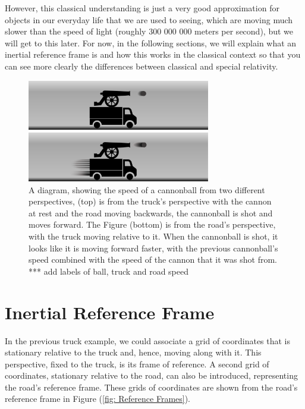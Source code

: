 However, this classical understanding is just a very good approximation for objects in our everyday life that we are used to seeing, which are moving much slower than the speed of light (roughly 300 000 000 meters per second), but we will get to this later.
For now, in the following sections, we will explain what an inertial reference frame is and how this works in the classical context so that you can see more clearly the differences between classical and special relativity.

\begin{figure}[H]
	\centering
	\includegraphics[width = 8cm]{images/pdf/lorry_cannonball.pdf}
	\caption{A diagram, showing the speed of a cannonball from two different perspectives, (top) is from the truck's perspective with the cannon at rest and the road moving backwards, the cannonball is shot and moves forward. The Figure (bottom) is from the road's perspective, with the truck moving relative to it. When the cannonball is shot, it looks like it is moving forward faster, with the previous cannonball's speed combined with the speed of the cannon that it was shot from. *** add labels of ball, truck and road speed}
	\label{fig: truck cannonball}
\end{figure}

\section{Inertial Reference Frame} \label{sect: Inertial Reference Frame}

In the previous truck example, we could associate a grid of coordinates that is stationary relative to the truck and, hence, moving along with it.
This perspective, fixed to the truck, is its frame of reference.
A second grid of coordinates, stationary relative to the road, can also be introduced, representing the road's reference frame.
These grids of coordinates are shown from the road's reference frame in Figure (\ref{fig: Reference Frames}).


